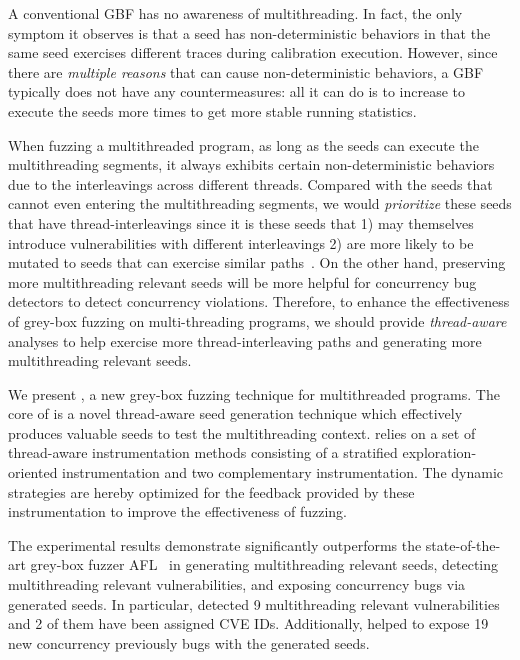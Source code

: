 A conventional GBF has no awareness of multithreading.
In fact, the only symptom it observes is that a seed has non-deterministic behaviors in that the same seed exercises different traces during calibration execution.
However, since there are \emph{multiple reasons} that can cause non-deterministic behaviors, a GBF typically does not have any countermeasures: all it can do is to increase \Ncal to execute the seeds more times to get more stable running statistics.

When fuzzing a multithreaded program, as long as the seeds can execute the multithreading segments, it always exhibits certain non-deterministic behaviors due to the interleavings across different threads. Compared with the seeds that cannot even entering the multithreading segments, we would \emph{prioritize} these seeds that have thread-interleavings since it is these seeds that 1) may themselves introduce vulnerabilities with different interleavings 2) are more likely to be mutated to seeds that can exercise similar paths~\cite{fuzz_survey}. On the other hand, preserving more multithreading relevant seeds will be more helpful for concurrency bug detectors to detect concurrency violations. Therefore, to enhance the effectiveness of grey-box fuzzing on multi-threading programs, we should provide \emph{thread-aware} analyses to help exercise more thread-interleaving paths and generating more multithreading relevant seeds.


We present \mtfuzz, a new grey-box fuzzing technique for multithreaded programs.
The core of \mtfuzz is a novel thread-aware seed generation technique which
effectively produces valuable seeds to test the multithreading context. 
\mtfuzz relies on a set of thread-aware instrumentation methods consisting of a
stratified exploration-oriented instrumentation and two complementary instrumentation. The dynamic strategies are hereby optimized for the feedback provided by these instrumentation to improve the effectiveness of fuzzing.

The experimental results demonstrate \mtfuzz significantly outperforms the state-of-the-art grey-box fuzzer AFL~\cite{afl} in generating multithreading relevant seeds, detecting multithreading relevant vulnerabilities, and exposing concurrency bugs via generated seeds. In particular, \mtfuzz detected 9 multithreading relevant vulnerabilities and 2 of them have been assigned CVE IDs. Additionally, \mtfuzz helped to expose 19 new concurrency previously bugs with the generated seeds. 

